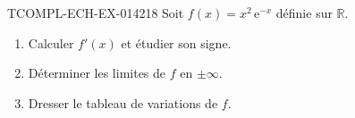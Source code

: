 \begin{exercice}{TCOMPL-ECH-EX-014}{2}{18}
Soit $f(x) = x^2\,\mathrm{e}^{-x}$ définie sur $\mathbb{R}$.
\begin{enumerate}
  \item Calculer $f'(x)$ et étudier son signe.
  \item Déterminer les limites de $f$ en $\pm\infty$.
  \item Dresser le tableau de variations de $f$.
\end{enumerate}

\end{exercice}

